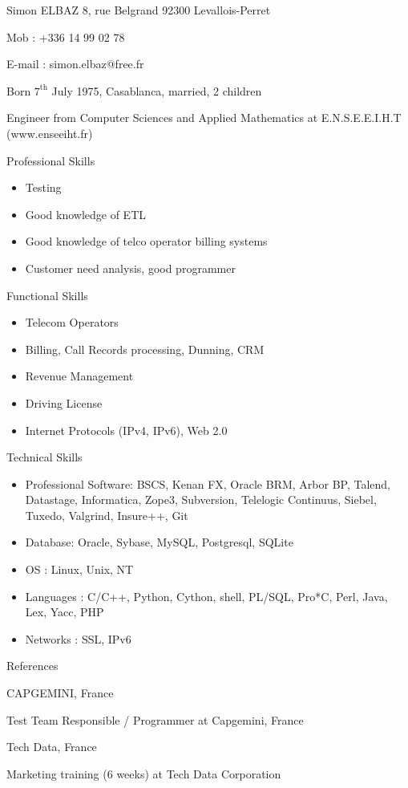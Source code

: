 \documentclass[a4paper,11pt]{letter}
\date{31 July 2008}
\begin{document}
Simon ELBAZ                8, rue Belgrand            92300 Levallois-Perret


Mob :    +336 14 99 02 78

E-mail : simon.elbaz@free.fr

Born $7^\mathrm{th}$ July 1975, Casablanca, married, 2 children

Engineer from Computer Sciences and Applied Mathematics at E.N.S.E.E.I.H.T (www.enseeiht.fr)

Professional Skills
\begin{itemize}
\item    Testing
\item    Good knowledge of ETL
\item    Good knowledge of telco operator billing systems
\item    Customer need analysis, good programmer
\end{itemize}

Functional Skills
\begin{itemize}
\item    Telecom Operators
\item    Billing, Call Records processing, Dunning, CRM
\item    Revenue Management
\item    Driving License
\item    Internet Protocols (IPv4, IPv6), Web 2.0
\end{itemize}

Technical Skills
\begin{itemize}
\item    Professional Software: BSCS, Kenan FX, Oracle BRM, Arbor BP, Talend, Datastage, Informatica, Zope3, Subversion, Telelogic Continuus, Siebel, Tuxedo, Valgrind, Insure++, Git 
\item    Database: Oracle, Sybase, MySQL, Postgresql, SQLite
\item    OS : Linux, Unix, NT
\item    Languages : C/C++, Python, Cython, shell, PL/SQL, Pro*C, Perl, Java, Lex, Yacc, PHP
\item    Networks : SSL, IPv6
\end{itemize}

References

CAPGEMINI, France
	

Test Team Responsible / Programmer at Capgemini, France
	

Tech Data, France
	

Marketing training (6 weeks) at Tech Data Corporation
\end{document}
